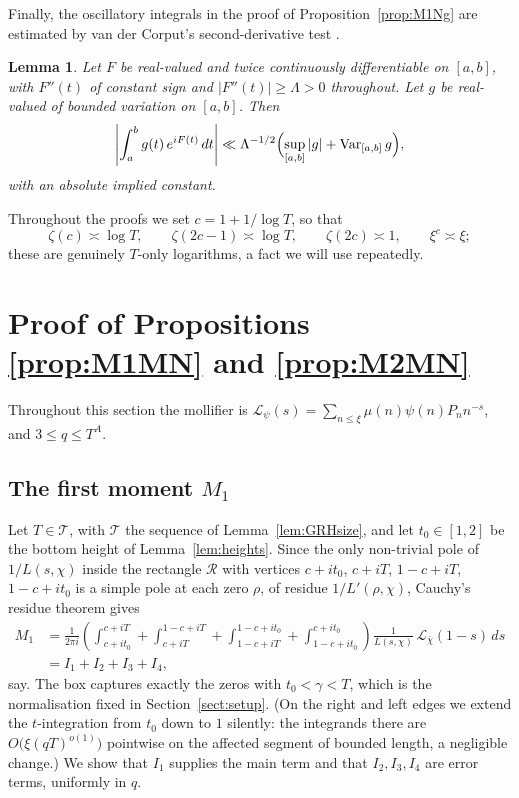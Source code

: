 \documentclass[12pt,a4paper,reqno]{amsart}
\newtheorem{lemma}[theorem]{Lemma}
\theoremstyle{remark}
\numberwithin{equation}{section}
\begin{document}
Finally, the oscillatory integrals in the proof of Proposition~\ref{prop:M1Ng} are estimated by van der Corput's second-derivative test \cite[Lemma~4.5]{Titchmarsh}.

\begin{lemma}\label{lem:vdc}
Let $F$ be real-valued and twice continuously differentiable on $[a,b]$, with $F''(t)$ of constant sign and $|F''(t)|\ge\Lambda>0$ throughout. Let $g$ be real-valued of bounded variation on $[a,b]$. Then
\[
\left|\int_a^b g(t)\,e^{iF(t)}\,dt\right|\ll\Lambda^{-1/2}\Bigl(\sup_{[a,b]}|g|+\operatorname{Var}_{[a,b]}g\Bigr),
\]
with an absolute implied constant.
\end{lemma}

Throughout the proofs we set $c=1+1/\log T$, so that
\[
\zeta(c)\asymp\log T,\qquad \zeta(2c-1)\asymp\log T,\qquad \zeta(2c)\asymp1,\qquad \xi^{c}\asymp\xi;
\]
these are genuinely $T$-only logarithms, a fact we will use repeatedly.

\section{Proof of Propositions \ref{prop:M1MN} and \ref{prop:M2MN}}\label{sect:propsMN}

Throughout this section the mollifier is $\mathcal{L}_\psi(s)=\sum_{n\le\xi}\mu(n)\psi(n)P_n n^{-s}$, and $3\le q\le T^{A}$.

\subsection{The first moment $M_1$}
Let $T\in\mathcal T$, with $\mathcal T$ the sequence of Lemma~\ref{lem:GRHsize}, and let $t_0\in[1,2]$ be the bottom height of Lemma~\ref{lem:heights}. Since the only non-trivial pole of $1/L(s,\chi)$ inside the rectangle $\mathcal R$ with vertices $c+it_0$, $c+iT$, $1-c+iT$, $1-c+it_0$ is a simple pole at each zero $\rho$, of residue $1/L'(\rho,\chi)$, Cauchy's residue theorem gives
\[
\begin{aligned}
M_1&=\frac{1}{2\pi i}\left(\int_{c+it_0}^{c+iT}+\int_{c+iT}^{1-c+iT}+\int_{1-c+iT}^{1-c+it_0}+\int_{1-c+it_0}^{c+it_0}\right)\frac{1}{L(s,\chi)}\,\mathcal{L}_{\bar\chi}(1-s)\,ds\\
&=I_1+I_2+I_3+I_4,
\end{aligned}
\]
say. The box captures exactly the zeros with $t_0<\gamma<T$, which is the normalisation fixed in Section~\ref{sect:setup}. (On the right and left edges we extend the $t$-integration from $t_0$ down to $1$ silently: the integrands there are $O\bigl(\xi(qT)^{o(1)}\bigr)$ pointwise on the affected segment of bounded length, a negligible change.) We show that $I_1$ supplies the main term and that $I_2,I_3,I_4$ are error terms, uniformly in $q$.
\end{document}
